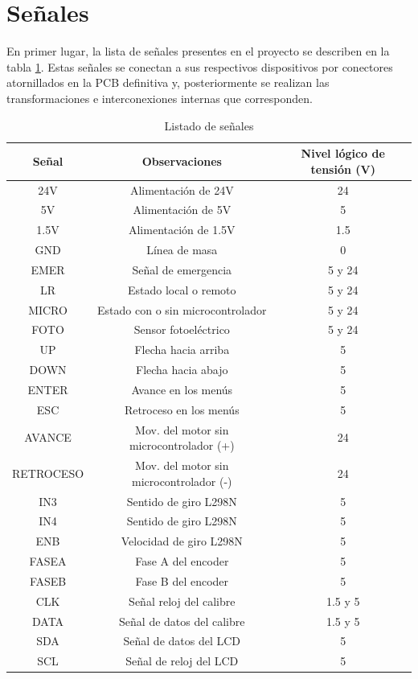 \section{Señales}

En primer lugar, la lista de señales presentes en el proyecto se describen en la tabla \ref{tab:tab2}.
Estas señales se conectan a sus respectivos dispositivos por conectores atornillados en la PCB definitiva
y, posteriormente se realizan las transformaciones e interconexiones internas que corresponden.

\begin{table}[hbtp]
    \begin{center}
    \begin{tabular}{ | c | c | c | }
    \hline
    Señal & Observaciones & Nivel lógico de tensión (V)\\ \hline
    24V & Alimentación de 24V & 24\\
    5V & Alimentación de 5V &5\\
    1.5V & Alimentación de 1.5V& 1.5\\
    GND & Línea de masa &0\\
    EMER & Señal de emergencia & 5 y 24 \\
    LR &  Estado local o remoto & 5 y 24  \\
    MICRO &  Estado con o sin microcontrolador & 5 y 24 \\
    FOTO & Sensor fotoeléctrico &5 y 24\\
    UP & Flecha hacia arriba &5\\
    DOWN & Flecha hacia abajo &5\\    
    ENTER & Avance en los menús &5\\
    ESC & Retroceso en los menús &5\\
    AVANCE & Mov. del motor sin microcontrolador (+) &24\\
    RETROCESO & Mov. del motor sin microcontrolador (-) & 24\\
    IN3 & Sentido de giro L298N &5\\
    IN4 & Sentido de giro L298N &5\\
    ENB & Velocidad de giro L298N &5\\
    FASEA & Fase A del encoder &5\\
    FASEB & Fase B del encoder &5\\
    CLK & Señal reloj del calibre &1.5 y 5\\
    DATA & Señal de datos del calibre &1.5 y 5\\
    SDA & Señal de datos del LCD &5\\
    SCL & Señal de reloj del LCD &5\\
    
    \hline

    \end{tabular}
    \end{center}
    \caption{Listado de señales}
    \label{tab:tab2}
    \end{table}

